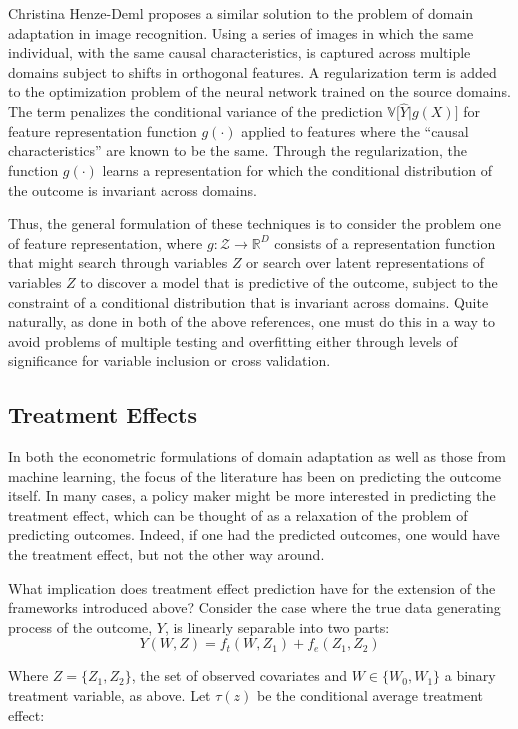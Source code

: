 \documentclass[a4paper,12pt]{article}
\begin{document}
Christina Henze-Deml \parencite*{Heinze-deml2017} proposes a similar solution to the problem of domain adaptation in image recognition. Using a series of images in which the same individual, with the same causal characteristics, is captured across multiple domains subject to shifts in orthogonal features. A regularization term is added to the optimization problem of the neural network trained on the source domains. The term penalizes the conditional variance of the prediction $\mathbb{V}\big[ \hat{Y}| g(X) \big]$ for feature representation function $g(\cdot)$ applied to features where the ``causal characteristics'' are known to be the same. Through the regularization, the function $g(\cdot)$ learns a representation for which the conditional distribution of the outcome is invariant across domains. 

Thus, the general formulation of these techniques is to consider the problem one of feature representation, where $g: \mathcal{Z} \rightarrow \mathbb{R}^D$ consists of a representation function that might search through variables $Z$ or search over latent representations of variables $Z$ to discover a model that is predictive of the outcome, subject to the constraint of a conditional distribution that is invariant across domains. Quite naturally, as done in both of the above references, one must do this in a way to avoid problems of multiple testing and overfitting either through levels of significance for variable inclusion or cross validation. 

\subsection{Treatment Effects}

In both the econometric formulations of domain adaptation as well as those from machine learning, the focus of the literature has been on predicting the outcome itself. In many cases, a policy maker might be more interested in predicting the treatment effect, which can be thought of as a relaxation of the problem of predicting outcomes. Indeed, if one had the predicted outcomes, one would have the treatment effect, but not the other way around. 

What implication does treatment effect prediction have for the extension of the frameworks introduced above? Consider the case where the true data generating process of the outcome, $Y$, is linearly separable into two parts: 
%
$$
Y(W,Z) = f_t(W,Z_1) + f_e(Z_1, Z_2)
$$

Where $Z = \{ Z_1, Z_2 \}$, the set of observed covariates and $W \in \{ W_0, W_1 \}$ a binary treatment variable, as above. Let $\tau(z)$ be the conditional average treatment effect: 
\end{document}
